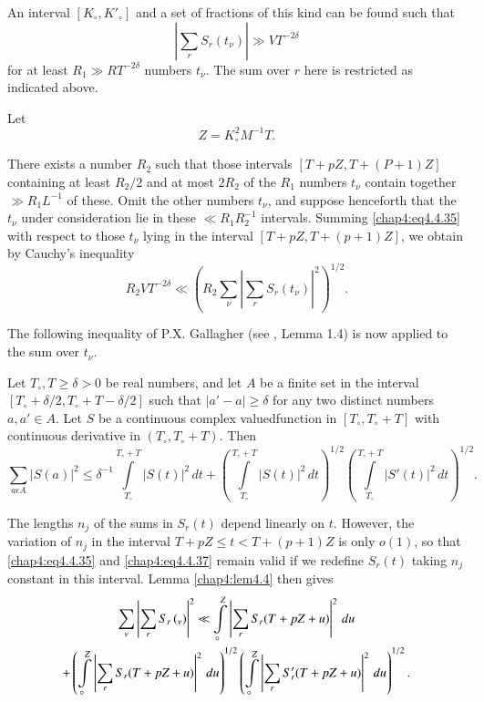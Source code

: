 An interval $[K_\circ,K'_\circ]$ and a set of fractions of this kind can be found such that 
\begin{equation}\label{chap4:eq4.4.35}
\left|\sum\limits_r S_r\left(t_\nu\right)\right|\gg VT^{-2\delta}
\end{equation}
for at least $R_1\gg RT^{-2\delta}$ numbers $t_\nu$. The sum over $r$ here is restricted as indicated above.

Let
\begin{equation}\label{chap4:eq4.4.36}
Z=K_\circ^2 M^{-1}T.
\end{equation}

There exists a number $R_2$ such that those intervals $[T+pZ,T+(P+1)Z]$ containing at least $R_2/2$ and at most $2R_2$ of the $R_1$ numbers $t_\nu$ contain together $\gg R_1L^{-1}$ of these. Omit the other numbers $t_\nu$, and suppose henceforth that the $t_\nu$ under consideration lie in these $\ll R_1R_2^{-1}$ intervals. Summing \eqref{chap4:eq4.4.35} with respect to those $t_\nu$ lying in the interval $[T+pZ,T+(p+1)Z]$, we obtain by Cauchy's inequality
\begin{equation}\label{chap4:eq4.4.37}
R_2VT^{-2\delta}\ll \left(R_2\sum\limits_\nu\left|\sum\limits_r S_r\left(t_\nu \right)\right|^2\right)^{1/2}.
\end{equation}

The following inequality of P.X. Gallagher (see \cite{key23}, Lemma 1.4) is now applied to the sum over $t_\nu$.

\begin{lem}\label{chap4:lem4.4}
Let $T_\circ, T\geq\delta >0$ be real numbers, and let $A$ be a finite set in the interval $[T_\circ +\delta/2, T_\circ +T-\delta/2]$ such that $|a'-a|\geq\delta$ for any two distinct numbers $a, a'\in A$. Let $S$ be a continuous complex valued\pageoriginale function in $[T_\circ,T_\circ+T]$ with continuous derivative in $(T_\circ,T_\circ +T)$. Then
$$
\sum\limits_{a\epsilon A}|S(a)|^2\leq\delta^{-1}\int\limits_{T_\circ}^{T_\circ+T}|S(t)|^2 \,dt+\left(\int\limits_{T_\circ}^{T_\circ +T}|S(t)|^2\,dt\right)^{1/2}\left( \int\limits_{T_\circ}^{T_\circ +T}|S'(t)|^2\,dt\right)^{1/2}.
$$
\end{lem}

The lengths $n_j$ of the sums in $S_r(t)$ depend linearly on
$t$. However, the variation of $n_j$ in the interval $T+pZ\leq
t<T+(p+1)Z$ is only $o(1)$, so that \eqref{chap4:eq4.4.35} and
\eqref{chap4:eq4.4.37} remain valid if we redefine $S_r(t)$ taking
$n_j$ constant in this interval. Lemma \ref{chap4:lem4.4} then gives 
\begin{gather}
\sum\limits_\nu\left|\sum\limits_r S_r\left(_\nu\right)\right|^2\ll \int\limits_\circ^Z\left|\sum\limits_rS_r(T+pZ+u)\right|^2 \,du\label{chap4:eq4.4.38}\\
+\left(\int\limits_\circ^Z\left|\sum\limits_rS_r(T+pZ+u)\right|^2\,du\right)^{1/2}\left(\int\limits_\circ^Z\left|\sum\limits_rS'_r(T+pZ+u)\right|^2\,du \right)^{1/2}.\notag
\end{gather}

